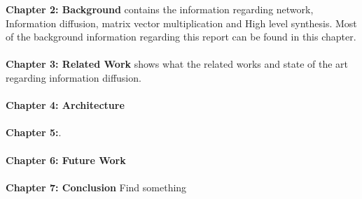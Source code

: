 \textbf{Chapter 2: Background} contains the information regarding network, Information diffusion, matrix vector multiplication and High level synthesis. Most of the background information regarding this report can be found in this chapter. \\ \hfil \\ \hfil
\textbf{Chapter 3: Related Work} shows what the related works and state of the art regarding information diffusion.\\ \hfil \\ \hfil
\textbf{Chapter 4: Architecture}  \\ \hfil \\ \hfil
\textbf{Chapter 5:}.  \\ \hfil \\ \hfil
\textbf{Chapter 6: Future Work}  \\ \hfil \\ \hfil
\textbf{Chapter 7: Conclusion} Find something \\ \hfil \\ \hfil